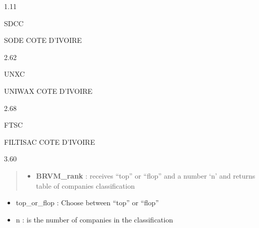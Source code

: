\documentclass[
]{article}
\providecommand{\tightlist}{%
  \setlength{\itemsep}{0pt}\setlength{\parskip}{0pt}}
\begin{document}
1.11

SDCC

SODE COTE D'IVOIRE

2.62

UNXC

UNIWAX COTE D'IVOIRE

2.68

FTSC

FILTISAC COTE D'IVOIRE

3.60

\begin{quote}
\begin{itemize}
\tightlist
\item
  \textbf{BRVM\_rank} : receives ``top'' or ``flop'' and a number `n'
  and returns table of companies classification
\end{itemize}
\end{quote}

\begin{itemize}
\item
  top\_or\_flop : Choose between ``top'' or ``flop''
\item
  n : is the number of companies in the classification
\end{itemize}
\end{document}
